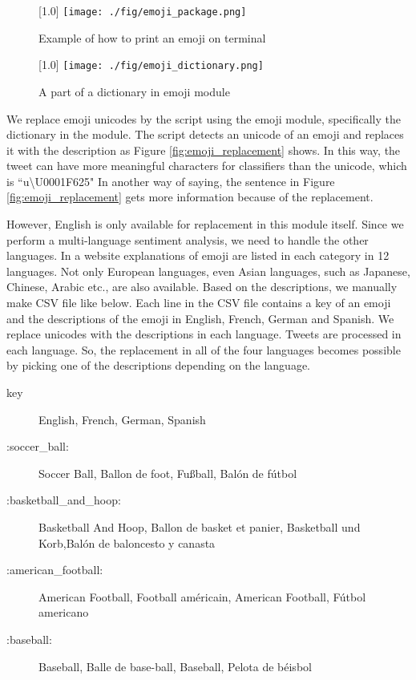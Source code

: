 \begin{figure}
	\centering
	\scalebox{1.0}[1.0]{
	\texttt{[image: ./fig/emoji\_package.png]}
	}
	\caption{Example of how to print an emoji on terminal}
	\label{fig:thumbs_up}
\end{figure}


\begin{figure}
	\centering
	\scalebox{1.0}[1.0]{
	\texttt{[image: ./fig/emoji\_dictionary.png]}
	}
	\caption{A part of a dictionary in emoji module}
	\label{fig:emoji_dict}
\end{figure}


We replace emoji unicodes by the script using the emoji module, specifically the dictionary in the module.
The script detects an unicode of an emoji and replaces it with the description as Figure \ref{fig:emoji_replacement} shows.
In this way, the tweet can have more meaningful characters for classifiers than the unicode, which is ``u\textbackslash U0001F625"
In another way of saying, the sentence in Figure \ref{fig:emoji_replacement} gets more information because of the replacement.

However, English is only available for replacement in this module itself.
Since we perform a multi-language sentiment analysis, we need to handle the other languages.
In a website \cite{emoji_explanation} explanations of emoji are listed in each category in 12 languages. 
Not only European languages, even Asian languages, such as Japanese, Chinese, Arabic etc., are also available.
Based on the descriptions, we manually make CSV file like below.
Each line in the CSV file contains a key of an emoji and the descriptions of the emoji in English, French, German and Spanish.
We replace unicodes with the descriptions in each language.
Tweets are processed in each language.
So, the replacement in all of the four languages becomes possible by picking one of the descriptions depending on the language. 
\begin{description}
	\item[key] English, French, German, Spanish
	\item[:soccer\_ball:] Soccer Ball, Ballon de foot, Fu{\ss}ball, Bal\'on de f\'utbol
	\item[:basketball\_and\_hoop:] Basketball And Hoop, Ballon de basket et panier, Basketball und Korb,Bal\'on de baloncesto y canasta
	\item[:american\_football:] American Football, Football am\'ericain, American Football, F\'utbol americano

	\item[:baseball:]Baseball, Balle de base-ball, Baseball, Pelota de b\'eisbol
\end{description}

